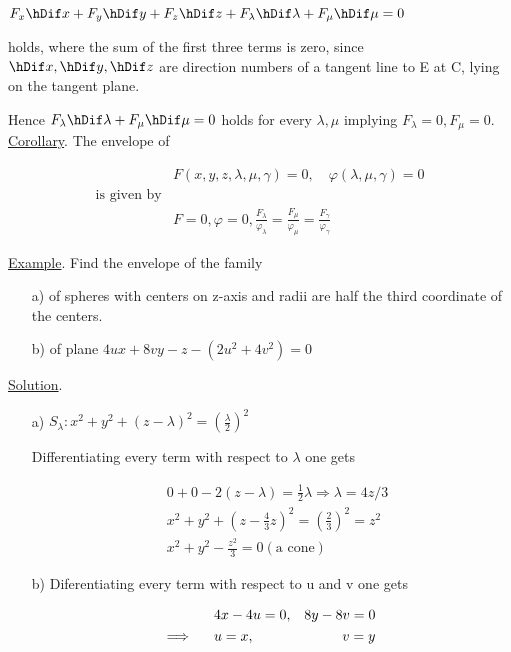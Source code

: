 \documentclass[12pt]{article}
\begin{document}

	\begin{center}

	$F_{x}  \hDif x + F_{y} \hDif y + F_{z} \hDif z + F_{\lambda} \hDif \lambda + F_{\mu} \hDif \mu = 0$
	
	\end{center}

	\noindent holds, where the sum of the first three terms is zero, since $\hDif x , \hDif y , \hDif z$ are direction numbers of a tangent line to E at C, lying on the tangent plane.

	Hence $F_{\lambda} \hDif \lambda + F_{\mu} \hDif \mu = 0$ holds for every $\lambda , \mu$ implying $F_{\lambda} = 0 , F_{\mu} = 0$. \\
	
	\underline{Corollary}. The envelope of

	\begin{align*}
		&F(x, y, z, \lambda , \mu , \gamma ) = 0 , \quad  \varphi (\lambda , \mu , \gamma ) = 0 \\
		\text{is given by} \\
		&F = 0 , \varphi = 0 , \frac{F_{\lambda}}{\varphi_{\lambda}} = \frac{F_{\mu}}{\varphi_{\mu}} = \frac{F_{\gamma}}{\varphi_{\gamma}}
	\end{align*}


	\underline{Example}. Find the envelope of the family 

	\begin{enumerate}
	\item[a)] of spheres with centers on z-axis and radii are half the third coordinate of the centers. 

	\item[b)] of plane $4ux + 8vy - z - (2u^{2} + 4v^{2}) = 0$ 

	\end{enumerate}
	
	\underline{Solution}.

	\begin{enumerate}
	
	\item[a)] $S_{\lambda} : x^{2} + y^{2} + (z-\lambda)^{2} = (\frac{\lambda}{2})^{2} $

	Differentiating every term with respect to $\lambda$ one gets

		\begin{align*}
			&0 + 0 - 2(z-\lambda) = \frac{1}{2} \lambda \Longrightarrow \lambda = 4z/3 \\
			&x^{2} + y^{2} + (z - \frac{4}{3} z)^{2} = (\frac{2}{3})^2 = z^{2} \\
			&x^{2} + y^{2} - \frac{z^{2}}{3} = 0 (\text{a cone})
		\end{align*}

	\item[b)] Diferentiating every term with respect to u and v one gets

		\begin{align*}
			&4x - 4u = 0,	&	8y - 8v = 0		& \\
			\Longrightarrow \indent &u = x,	&	v=y	&
		\end{align*}

	\end{enumerate}

	

	
\end{document}
